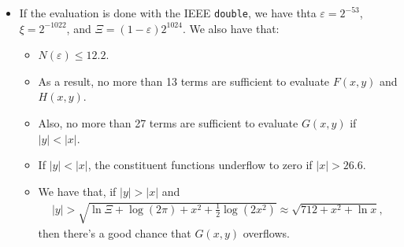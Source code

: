 \documentclass[10pt]{article}
\begin{document}
\begin{itemize}
    \item If the evaluation is done with the IEEE \texttt{double}, we have thta $\varepsilon = 2^{-53}$, $\xi = 2^{-1022}$, and $\Xi = (1- \varepsilon)2^{1024}$. We also have that:
    \begin{itemize}
      \item $N(\varepsilon) \leq 12.2$. 
      \item As a result, no more than 13 terms are sufficient to evaluate $F(x,y)$ and $H(x,y)$.
      \item Also, no more than 27 terms are sufficient to evaluate $G(x,y)$ if $|y| < |x|$.
      \item If $|y| < |x|$, the constituent functions underflow to zero if $|x| > 26.6$.
      \item We have that, if $|y| > |x|$ and
      \begin{align*}
        |y| > \sqrt{\ln \Xi + \log(2\pi) + x^2 + \frac{1}{2}\log(2x^2)} \approx \sqrt{712 + x^2 + \ln x},
      \end{align*}
      then there's a good chance that $G(x,y)$ overflows.
    \end{itemize}
  \end{itemize}
      
		

	
\end{document}
